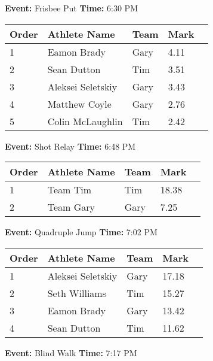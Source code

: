\documentclass[10pt]{article}
\begin{document}
\textbf{Event:} Frisbee Put \quad \textbf{Time:} 6:30 PM 

\vspace{1em}
\begin{tabular}{@{}lllll@{}}
\toprule

\textbf{Order} & \textbf{Athlete Name} & \textbf{Team} & \textbf{Mark} \\
\midrule
1 & Eamon Brady & Gary & 4.11 &\\
2 & Sean Dutton & Tim & 3.51 &\\
3 & Aleksei Seletskiy & Gary & 3.43 &\\
4 & Matthew Coyle & Gary & 2.76 &\\
5 & Colin McLaughlin & Tim & 2.42 &\\
\bottomrule
\end{tabular}
\vspace{2.5em}


\textbf{Event:} Shot Relay \quad \textbf{Time:} 6:48 PM 

\vspace{1em}
\begin{tabular}{@{}lllll@{}}
\toprule

\textbf{Order} & \textbf{Athlete Name} & \textbf{Team} & \textbf{Mark} \\
\midrule
1 & Team Tim & Tim & 18.38 &\\
2 & Team Gary & Gary & 7.25 &\\
\bottomrule
\end{tabular}
\vspace{2.5em}


\textbf{Event:} Quadruple Jump \quad \textbf{Time:} 7:02 PM 

\vspace{1em}
\begin{tabular}{@{}lllll@{}}
\toprule

\textbf{Order} & \textbf{Athlete Name} & \textbf{Team} & \textbf{Mark} \\
\midrule
1 & Aleksei Seletskiy & Gary & 17.18 &\\
2 & Seth Williams & Tim & 15.27 &\\
3 & Eamon Brady & Gary & 13.42 &\\
4 & Sean Dutton & Tim & 11.62 &\\
\bottomrule
\end{tabular}
\vspace{2.5em}


\textbf{Event:} Blind Walk \quad \textbf{Time:} 7:17 PM 
\end{document}
